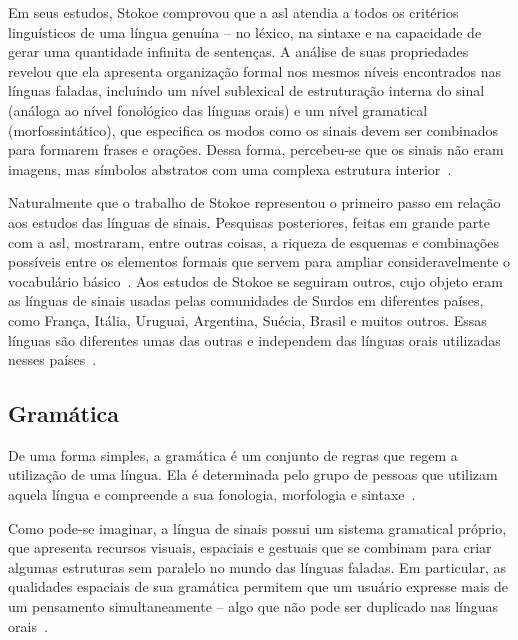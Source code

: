 Em seus estudos, Stokoe comprovou que a \acrshort{asl} atendia a todos os critérios linguísticos de uma língua genuína -- no léxico, na sintaxe e na capacidade de  gerar uma quantidade infinita de sentenças.
A análise de suas propriedades revelou que ela apresenta organização formal nos mesmos níveis encontrados nas línguas faladas, incluindo um nível sublexical de estruturação interna do sinal (análoga ao nível fonológico das línguas orais) e um nível gramatical (morfossintático), que especifica os modos como os sinais devem ser combinados para formarem frases e orações. Dessa forma, percebeu-se que os sinais não eram imagens, mas símbolos abstratos com uma complexa estrutura interior~\cite{stokoe-1960-sl-structure,quadros-2004-estudos-linguisticos, pereira-2011-conhecimento-alem-sinais}.


Naturalmente que o trabalho de Stokoe representou o primeiro passo em relação aos estudos das línguas de sinais. Pesquisas posteriores, feitas em grande parte com a \acrshort{asl}, mostraram, entre outras coisas, a riqueza de esquemas e combinações possíveis entre  os elementos formais que servem para ampliar consideravelmente o vocabulário básico~\cite{quadros-2004-estudos-linguisticos}.
Aos estudos de Stokoe se seguiram outros, cujo objeto eram as línguas de sinais usadas pelas comunidades de Surdos em diferentes países, como França, Itália, Uruguai,  Argentina, Suécia, Brasil e muitos outros. Essas línguas são diferentes umas das outras e independem das línguas orais utilizadas nesses países~\cite{pereira-2011-conhecimento-alem-sinais}.


\subsection{Gramática}
\label{linguistica-gramatica}

De uma forma simples, a gramática é um conjunto de regras que regem a utilização de uma língua. Ela é determinada pelo grupo de pessoas que utilizam aquela língua e compreende a sua fonologia, morfologia e sintaxe~\cite{jay-2011-dont-just-sign,quadros-2004-estudos-linguisticos}.


Como pode-se imaginar, a língua de sinais possui um sistema gramatical próprio, que apresenta recursos visuais, espaciais e gestuais que se combinam para criar algumas estruturas sem paralelo no mundo das línguas faladas. Em particular, as qualidades espaciais de sua gramática permitem que um usuário expresse mais de um pensamento simultaneamente – algo que não pode ser duplicado nas línguas orais~\cite{jay-2011-dont-just-sign, stewart-2021-barrons-asl}.


